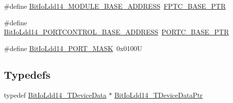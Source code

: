 \begin{DoxyCompactItemize}
\#define \hyperlink{group___bit_io_ldd14__module_ga50a04aaab817aa3ebcda4f8fe30c7a16}{Bit\+Io\+Ldd14\+\_\+\+M\+O\+D\+U\+L\+E\+\_\+\+B\+A\+S\+E\+\_\+\+A\+D\+D\+R\+E\+SS}~\hyperlink{group___backward___compatibility___symbols_gaed3b8398ebed63795f9ce57eb9a59097}{F\+P\+T\+C\+\_\+\+B\+A\+S\+E\+\_\+\+P\+TR}
\item 
\#define \hyperlink{group___bit_io_ldd14__module_gaf77676dbb018986c8cc4afc8747f3fa7}{Bit\+Io\+Ldd14\+\_\+\+P\+O\+R\+T\+C\+O\+N\+T\+R\+O\+L\+\_\+\+B\+A\+S\+E\+\_\+\+A\+D\+D\+R\+E\+SS}~\hyperlink{group___p_o_r_t___peripheral_ga03c740cdda17711afafc932723871474}{P\+O\+R\+T\+C\+\_\+\+B\+A\+S\+E\+\_\+\+P\+TR}
\item 
\#define \hyperlink{group___bit_io_ldd14__module_gae16ddb4e318f1d113a76c9685e18e15e}{Bit\+Io\+Ldd14\+\_\+\+P\+O\+R\+T\+\_\+\+M\+A\+SK}~0x0100U
\end{DoxyCompactItemize}
\subsection*{Typedefs}
\begin{DoxyCompactItemize}
\item 
typedef \hyperlink{struct_bit_io_ldd14___t_device_data}{Bit\+Io\+Ldd14\+\_\+\+T\+Device\+Data} $\ast$ \hyperlink{group___bit_io_ldd14__module_ga2a6b33c565bd632d2d62a9d38a82ef55}{Bit\+Io\+Ldd14\+\_\+\+T\+Device\+Data\+Ptr}
\end{DoxyCompactItemize}
